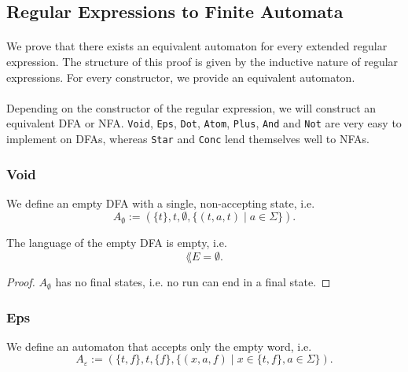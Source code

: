 \subsection{Regular Expressions to Finite Automata}

\paragraph{} 
We prove that there exists an equivalent automaton for every extended regular expression.
The structure of this proof is given by the inductive nature of regular expressions.
For every constructor, we provide an equivalent automaton.

\paragraph{}
Depending on the constructor of the regular expression, we will construct an equivalent DFA or NFA.
\lstinline{Void}, \lstinline{Eps}, \lstinline{Dot}, \lstinline{Atom}, \lstinline{Plus}, \lstinline{And} and \lstinline{Not} are very easy to implement on DFAs, whereas \lstinline{Star} and \lstinline{Conc} lend themselves well to NFAs.

\subsubsection{Void}
\begin{definition}
    We define an empty DFA with a single, non-accepting state, i.e.
    \begin{equation*}
        A_\emptyset := (\{t\}, t, \emptyset, \{(t, a, t) \; | \; a \in \Sigma\}).
    \end{equation*}
\end{definition}

\begin{lemma}
    \label{dfa_empty_correct}
    The language of the empty DFA is empty, i.e.
    \begin{equation*}
        \lang{E} = \emptyset.
    \end{equation*}
\end{lemma}

\begin{proof}
    $A_\emptyset$ has no final states, i.e. no run can end in a final state.
\end{proof}




\subsubsection{Eps}
\begin{definition}
    We define an automaton that accepts only the empty word, i.e.
    \begin{equation*}
        A_\varepsilon := (\{t, f\}, t, \{f\}, \{(x, a, f) \; | \; x \in \{t, f\}, a \in \Sigma\}).
    \end{equation*}
\end{definition}

